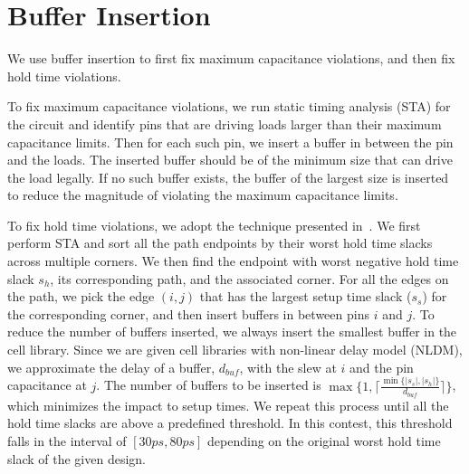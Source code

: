 \section{Buffer Insertion}
\label{sec:buf_insert}
We use buffer insertion to first fix maximum capacitance violations, and then fix hold time violations.

To fix maximum capacitance violations, we run static timing analysis (STA) for the circuit and identify pins that are driving loads larger than their maximum capacitance limits. Then for each such pin, we insert a buffer in between the pin and the loads. The inserted buffer should be of the minimum size that can drive the load legally. If no such buffer exists, the buffer of the largest size is inserted to reduce the magnitude of violating the maximum capacitance limits.

To fix hold time violations, we adopt the technique presented in~\cite{Shenoy:Minimum}. We first perform STA and sort all the path endpoints by their worst hold time slacks across multiple corners. We then find the endpoint with worst negative hold time slack $s_h$, its corresponding path, and the associated corner. For all the edges on the path, we pick the edge $(i, j)$ that has the largest setup time slack ($s_s$) for the corresponding corner, and then insert buffers in between pins $i$ and $j$. To reduce the number of buffers inserted, we always insert the smallest buffer in the cell library. Since we are given cell libraries with non-linear delay model (NLDM), we approximate the delay of a buffer, $d_{buf}$, with the slew at $i$ and the pin capacitance at $j$. The number of buffers to be inserted is $\max\{1, \lceil\frac{\min\{|s_s|, |s_h|\}}{d_{buf}}\rceil\}$, which minimizes the impact to setup times. We repeat this process until all the hold time slacks are above a predefined threshold. In this contest, this threshold falls in the interval of $[30ps, 80ps]$ depending on the original worst hold time slack of the given design.





